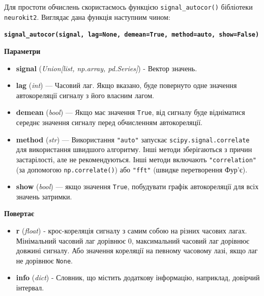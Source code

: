 \documentclass[
  letterpaper,
]{report}
\providecommand{\tightlist}{%
  \setlength{\itemsep}{0pt}\setlength{\parskip}{0pt}}\usepackage{longtable,booktabs,array}
\begin{document}
Для простоти обчислень скористаємось функцією \texttt{signal\_autocor()}
бібліотеки \texttt{neurokit2}. Виглядає дана функція наступним чином:

\textbf{\texttt{signal\_autocor(signal,\ lag=None,\ demean=True,\ method=\textquotesingle{}auto\textquotesingle{},\ show=False)}}

\textbf{Параметри}

\begin{itemize}
\tightlist
\item
  \textbf{signal} (\emph{Union{[}list, np.array, pd.Series{]}}) - Вектор
  значень.
\item
  \textbf{lag} (\emph{int}) --- Часовий лаг. Якщо вказано, буде
  повернуто одне значення автокореляції сигналу з його власним лагом.
\item
  \textbf{demean} (\emph{bool}) --- Якщо має значення \texttt{True}, від
  сигналу буде відніматися середнє значення сигналу перед обчисленням
  автокореляції.
\item
  \textbf{method} (\emph{str}) --- Використання \texttt{"auto"} запускає
  \texttt{scipy.signal.correlate} для використання швидшого алгоритму.
  Інші методи зберігаються з причин застарілості, але не рекомендуються.
  Інші методи включають \texttt{"correlation"} (за допомогою
  \texttt{np.correlate()}) або \texttt{"fft"} (швидке перетворення
  Фур'є).
\item
  \textbf{show} (\emph{bool}) --- якщо значення \texttt{True},
  побудувати графік автокореляції для всіх значень затримки.
\end{itemize}

\textbf{Повертає}

\begin{itemize}
\tightlist
\item
  \textbf{r} (\emph{float}) - крос-кореляція сигналу з самим собою на
  різних часових лагах. Мінімальний часовий лаг дорівнює 0, максимальний
  часовий лаг дорівнює довжині сигналу. Або значення кореляції на
  певному часовому лазі, якщо лаг не дорівнює \texttt{None}.
\item
  \textbf{info} (\emph{dict}) - Словник, що містить додаткову
  інформацію, наприклад, довірчий інтервал.
\end{itemize}
\end{document}
